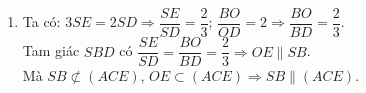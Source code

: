 \begin{bt}
{\begin{enumerate}
			$ABCD$ là hình thang có hai đáy là $AB$, $CD$ nên $\dfrac{BO}{OD}=\dfrac{AB}{CD}=2$.\\
			Tam giác $BDN$ có $\dfrac{BG}{GN}=\dfrac{BO}{OD}=2 \Rightarrow OG \parallel DN$.\\
			Mà $OG \not\subset (SCD)$, $DN \subset (SCD) \Rightarrow OG \parallel (SCD)$.
			\item Ta có: $3SE=2SD \Rightarrow \dfrac{SE}{SD}=\dfrac{2}{3}$; $\dfrac{BO}{OD}=2 \Rightarrow \dfrac{BO}{BD}=\dfrac{2}{3}$.\\
			Tam giác $SBD$ có $\dfrac{SE}{SD}=\dfrac{BO}{BD}=\dfrac{2}{3} \Rightarrow OE \parallel SB$.\\
			Mà $SB \not\subset (ACE)$, $OE \subset (ACE) \Rightarrow SB \parallel (ACE)$.
		\end{enumerate}
	}
\end{bt}
